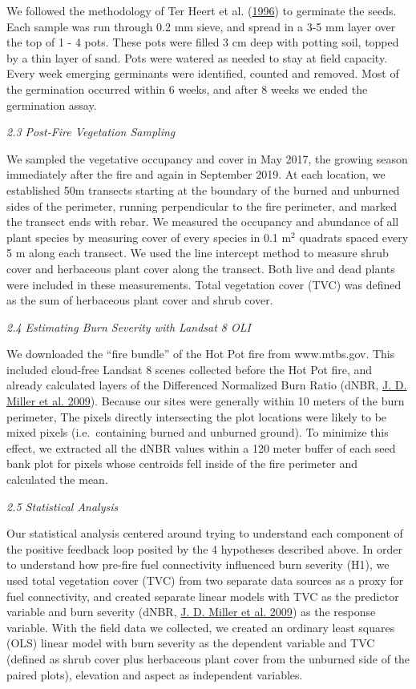 \documentclass[
  12pt,
]{article}
\begin{document}
We followed the methodology of Ter Heert et al.
(\protect\hyperlink{ref-Heerdt1996}{1996}) to germinate the seeds. Each
sample was run through 0.2 mm sieve, and spread in a 3-5 mm layer over
the top of 1 - 4 pots. These pots were filled 3 cm deep with potting
soil, topped by a thin layer of sand. Pots were watered as needed to
stay at field capacity. Every week emerging germinants were identified,
counted and removed. Most of the germination occurred within 6 weeks,
and after 8 weeks we ended the germination assay.

\emph{2.3 Post-Fire Vegetation Sampling}

We sampled the vegetative occupancy and cover in May 2017, the growing
season immediately after the fire and again in September 2019. At each
location, we established 50m transects starting at the boundary of the
burned and unburned sides of the perimeter, running perpendicular to the
fire perimeter, and marked the transect ends with rebar. We measured the
occupancy and abundance of all plant species by measuring cover of every
species in 0.1 m\(^2\) quadrats spaced every 5 m along each transect. We
used the line intercept method to measure shrub cover and herbaceous
plant cover along the transect. Both live and dead plants were included
in these measurements. Total vegetation cover (TVC) was defined as the
sum of herbaceous plant cover and shrub cover.

\emph{2.4 Estimating Burn Severity with Landsat 8 OLI}

We downloaded the ``fire bundle'' of the Hot Pot fire from www.mtbs.gov.
This included cloud-free Landsat 8 scenes collected before the Hot Pot
fire, and already calculated layers of the Differenced Normalized Burn
Ratio (dNBR, \protect\hyperlink{ref-Miller2009}{J. D. Miller et al.
2009}). Because our sites were generally within 10 meters of the burn
perimeter, The pixels directly intersecting the plot locations were
likely to be mixed pixels (i.e.~containing burned and unburned ground).
To minimize this effect, we extracted all the dNBR values within a 120
meter buffer of each seed bank plot for pixels whose centroids fell
inside of the fire perimeter and calculated the mean.

\emph{2.5 Statistical Analysis}

Our statistical analysis centered around trying to understand each
component of the positive feedback loop posited by the 4 hypotheses
described above. In order to understand how pre-fire fuel connectivity
influenced burn severity (H1), we used total vegetation cover (TVC) from
two separate data sources as a proxy for fuel connectivity, and created
separate linear models with TVC as the predictor variable and burn
severity (dNBR, \protect\hyperlink{ref-Miller2009}{J. D. Miller et al.
2009}) as the response variable. With the field data we collected, we
created an ordinary least squares (OLS) linear model with burn severity
as the dependent variable and TVC (defined as shrub cover plus
herbaceous plant cover from the unburned side of the paired plots),
elevation and aspect as independent variables.
\end{document}
